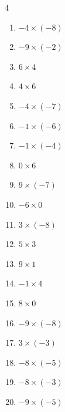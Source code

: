 \begin{multicols}{4}
\begin{enumerate}
  \item $-4\times (-8)$
        \phantom{$=32$}

  \item $-9\times (-2)$
        \phantom{$=18$}

  \item $6\times 4$
        \phantom{$=24$}

  \item $4\times 6$
        \phantom{$=24$}

  \item $-4\times (-7)$
        \phantom{$=28$}

  \item $-1\times (-6)$
        \phantom{$=6$}

  \item $-1\times (-4)$
        \phantom{$=4$}

  \item $0\times 6$
        \phantom{$=0$}

  \item $9\times (-7)$
        \phantom{$=-63$}

  \item $-6\times 0$
        \phantom{$=0$}

  \item $3\times (-8)$
        \phantom{$=-24$}

  \item $5\times 3$
        \phantom{$=15$}

  \item $9\times 1$
        \phantom{$=9$}

  \item $-1\times 4$
        \phantom{$=-4$}

  \item $8\times 0$
        \phantom{$=0$}

  \item $-9\times (-8)$
        \phantom{$=72$}

\columnbreak %

  \item $3\times (-3)$
        \phantom{$=-9$}

  \item $-8\times (-5)$
        \phantom{$=40$}

  \item $-8\times (-3)$
        \phantom{$=24$}

  \item $-9\times (-5)$
        \phantom{$=45$}


\end{enumerate}
\end{multicols}
